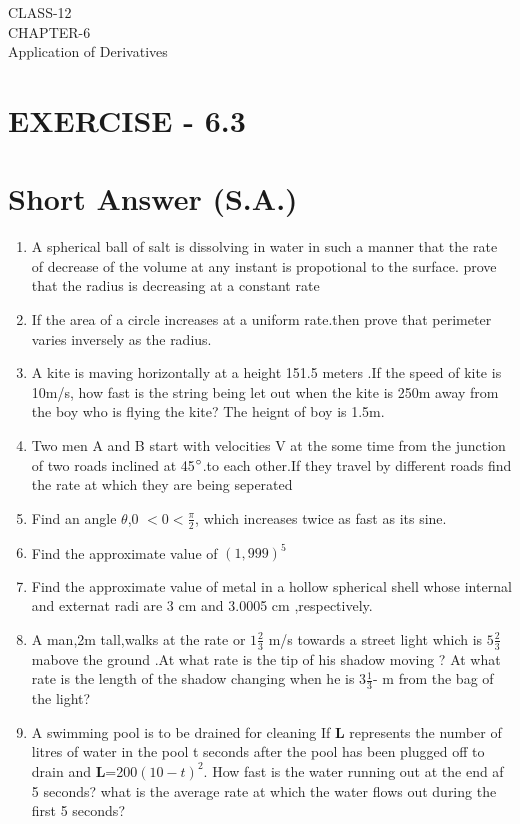 \documentclass[12pt]{article}
\let\vec\mathbf
\begin{document}
\begin{center}
\textbf\large{CLASS-12\\CHAPTER-6 \\ Application of Derivatives}
\end{center}

\section*{EXERCISE - 6.3}
\section*{Short Answer (S.A.)}
\begin{enumerate}
\item A spherical ball of salt is dissolving in water in such a manner that the rate of decrease of the volume at any instant is propotional to the surface. prove that the radius is decreasing at a constant rate
\item If the area of a circle increases at a uniform rate.then prove that perimeter varies inversely as the radius.
\item A kite is maving horizontally at a height 151.5 meters .If the speed of kite is 10m/s, how fast is the string being let out when the kite is 250m away from the boy who is flying the kite? The heignt of boy is 1.5m. 
 \item Two men A and B start with velocities V at  the some time from the junction of two roads inclined at 45$\degree$.to each other.If they travel by different roads find the rate at which they are being seperated
\item Find an angle $\theta$,0 $<$0$<$$\frac{\pi}{2}$, which increases twice as fast as its sine.
\item Find the approximate value of $(1,999)^5$
\item Find the approximate value of metal in a hollow spherical shell whose internal and externat radi are 3 cm and 3.0005 cm ,respectively.
\item A man,2m tall,walks at the rate or $1\frac{2}{3}$ m/s towards a street light which is $5\frac{2}{3}$ mabove the ground .At what rate is the tip of his shadow moving ? At what rate is the length of the shadow changing when he is $3\frac{1}{3}$- m from the bag of the light?
\item A swimming pool  is to be drained for cleaning If $\vec{L}$ represents the number of litres of water in the pool t seconds after the pool has been plugged off to drain and $\vec{L}$=200$(10-t)^2$. How fast is the water running out at the end af 5 seconds? what is the average rate at which the water flows out during the first 5 seconds?
$$
\end{enumerate}
\end{document}
